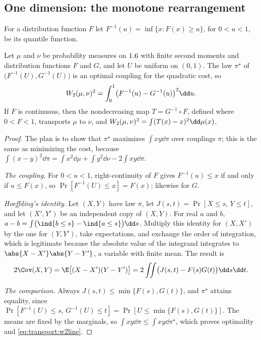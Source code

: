 \begin{refsection}
\subsection{One dimension: the monotone rearrangement}\label{sec:transport:oned}

For a distribution function $F$ let $F^{-1}(u)=\inf\{x:F(x)\ge u\}$, for $0<u<1$, be its quantile function.

\begin{theorem}\label{thm:transport:oned}
Let $\mu$ and $\nu$ be probability measures on $1.6$ with finite second moments and distribution functions $F$ and $G$, and let $U$ be uniform on $(0,1)$. The law $\pi^\star$ of $\bigl(F^{-1}(U),G^{-1}(U)\bigr)$ is an optimal coupling for the quadratic cost, so
\begin{equation}\label{eq:transport:w2line}
\transportW(\mu,\nu)^2=\int_0^1\bigl(F^{-1}(u)-G^{-1}(u)\bigr)^2\dd u.
\end{equation}
If $F$ is continuous, then the nondecreasing map $T=G^{-1}\circ F$, defined where $0<F<1$, transports $\mu$ to $\nu$, and $\transportW(\mu,\nu)^2=\int(T(x)-x)^2\dd\mu(x)$.
\end{theorem}

\begin{proof}
The plan is to show that $\pi^\star$ maximizes $\int xy\dd\pi$ over couplings $\pi$; this is the same as minimizing the cost, because $\int(x-y)^2\dd\pi=\int x^2\dd\mu+\int y^2\dd\nu-2\int xy\dd\pi$.

\emph{The coupling.} For $0<u<1$, right-continuity of $F$ gives $F^{-1}(u)\le x$ if and only if $u\le F(x)$, so $\Pr[F^{-1}(U)\le x]=F(x)$; likewise for $G$.

\emph{Hoeffding's identity.} Let $(X,Y)$ have law $\pi$, let $J(s,t)=\Pr[X\le s,\,Y\le t]$, and let $(X',Y')$ be an independent copy of $(X,Y)$. For real $a$ and $b$, $a-b=\int\bigl(\ind\{b\le s\}-\ind\{a\le s\}\bigr)\dd s$. Multiply this identity for $(X,X')$ by the one for $(Y,Y')$, take expectations, and exchange the order of integration, which is legitimate because the absolute value of the integrand integrates to $\abs{X-X'}\abs{Y-Y'}$, a variable with finite mean. The result is
\[
2\Cov(X,Y)=\E\bigl[(X-X')(Y-Y')\bigr]=2\iint\bigl(J(s,t)-F(s)G(t)\bigr)\dd s\dd t.
\]

\emph{The comparison.} Always $J(s,t)\le\min\{F(s),G(t)\}$, and $\pi^\star$ attains equality, since $\Pr[F^{-1}(U)\le s,\,G^{-1}(U)\le t]=\Pr[U\le\min\{F(s),G(t)\}]$. The means are fixed by the marginals, so $\int xy\dd\pi\le\int xy\dd\pi^\star$, which proves optimality and \eqref{eq:transport:w2line}.


\end{proof}
\end{refsection}
